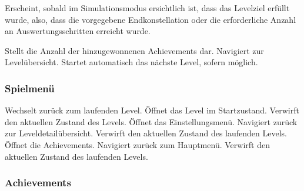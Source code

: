 Erscheint, sobald im Simulationsmodus ersichtlich ist, dass das Levelziel erfüllt wurde, also, dass die vorgegebene Endkonstellation oder die erforderliche Anzahl an Auswertungsschritten erreicht wurde.
\begin{requirements}
 Stellt die Anzahl der hinzugewonnenen Achievements dar.
 Navigiert zur Levelübersicht.
 Startet automatisch das nächste Level, sofern möglich.
\end{requirements}

\subsubsection{Spielmenü}

\begin{center}
\setlength\fboxsep{20pt}
\setlength\fboxrule{1pt}
\end{center}

\begin{requirements}
 Wechselt zurück zum laufenden Level.
 Öffnet das Level im Startzustand. Verwirft den aktuellen Zustand des Levels.
 Öffnet das Einstellungsmenü.
 Navigiert zurück zur Leveldetailübersicht. Verwirft den aktuellen Zustand des laufenden Levels.
 Öffnet die Achievements.
 Navigiert zurück zum Hauptmenü. Verwirft den aktuellen Zustand des laufenden Levels.
\end{requirements}

\subsubsection{Achievements}

